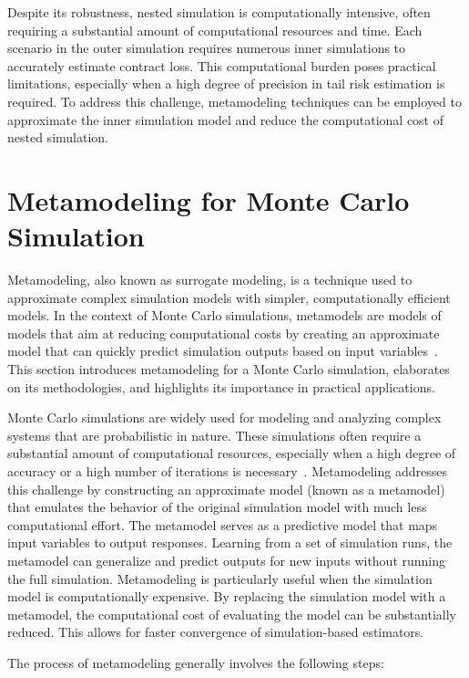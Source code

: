 Despite its robustness, nested simulation is computationally intensive, often requiring a substantial amount of computational resources and time. 
Each scenario in the outer simulation requires numerous inner simulations to accurately estimate contract loss. 
This computational burden poses practical limitations, especially when a high degree of precision in tail risk estimation is required.
To address this challenge, metamodeling techniques can be employed to approximate the inner simulation model and reduce the computational cost of nested simulation.

\section{Metamodeling for Monte Carlo Simulation}

Metamodeling, also known as surrogate modeling, is a technique used to approximate complex simulation models with simpler, computationally efficient models. 
In the context of Monte Carlo simulations, metamodels are models of models that aim at reducing computational costs by creating an approximate model that can quickly predict simulation outputs based on input variables~\citep{kleijnen2018design}. 
This section introduces metamodeling for a Monte Carlo simulation, elaborates on its methodologies, and highlights its importance in practical applications.

Monte Carlo simulations are widely used for modeling and analyzing complex systems that are probabilistic in nature. 
These simulations often require a substantial amount of computational resources, especially when a high degree of accuracy or a high number of iterations is necessary~\citep{glasserman2004monte}. 
Metamodeling addresses this challenge by constructing an approximate model (known as a metamodel) that emulates the behavior of the original simulation model with much less computational effort.
The metamodel serves as a predictive model that maps input variables to output responses. 
Learning from a set of simulation runs, the metamodel can generalize and predict outputs for new inputs without running the full simulation.
Metamodeling is particularly useful when the simulation model is computationally expensive. 
By replacing the simulation model with a metamodel, the computational cost of evaluating the model can be substantially reduced. 
This allows for faster convergence of simulation-based estimators.

The process of metamodeling generally involves the following steps:

